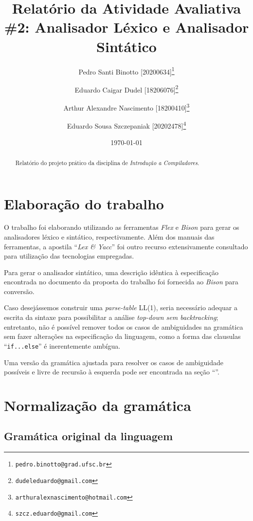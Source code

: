 \documentclass[12pt]{article}
\title{Relatório da Atividade Avaliativa \#2: Analisador Léxico e Analisador Sintático}
\author[1]{Pedro Santi Binotto [20200634]\thanks{\texttt{pedro.binotto@grad.ufsc.br}}}
\author[2]{Eduardo Caigar Dudel [18206076]\thanks{\texttt{dudeleduardo@gmail.com}}}
\author[3]{Arthur Alexandre Nascimento [18200410]\thanks{\texttt{arthuralexnascimento@hotmail.com}}}
\author[4]{Eduardo Sousa Szczepaniak [20202478]\thanks{\texttt{szcz.eduardo@gmail.com}}}
\date{\today}
\affil[1]{Departamento de Informática e Estatística, Universidade Federal de Santa Catarina}
\begin{document}
\begin{titlepage}
\maketitle
\thispagestyle{empty}

\begin{abstract}
  Relatório do projeto prático da disciplina de \textit{Introdução a Compiladores}.
\end{abstract}

\end{titlepage}

\newpage
\tableofcontents

\newpage
\section{Elaboração do trabalho}
\paragraph{}
O trabalho foi elaborando utilizando as ferramentas \textit{Flex}\cite{mitFlex1990} e \textit{Bison}\cite{mitBison1992}
para gerar os analisadores léxico e sintático, respectivamente. Além dos manuais das ferramentas, a apostila
``\textit{Lex \& Yacc}''\cite{niemannYacc} foi outro recurso extensivamente consultado para utilização das tecnologias
empregadas.

Para gerar o analisador sintático, uma descrição idêntica à especificação encontrada no documento da proposta do
trabalho foi fornecida ao \textit{Bison} para conversão. 

Caso desejássemos construir uma \textit{parse-table} LL(1), seria necessário adequar a escrita da sintaxe para
possibilitar a análise \textit{top-down sem backtracking}; entretanto, não é possível remover todos os casos de
ambiguidades na gramática sem fazer alterações na especificação da linguagem, como a forma das clausulas
``\texttt{if...else}'' é inerentemente ambígua. 

Uma versão da gramática ajustada para resolver os casos de ambiguidade possíveis e livre de recursão à esquerda pode ser
encontrada na seção ``''.

\newpage
\section{Normalização da gramática}
\label{sec:normalizacao-gramatica}
\subsection{Gramática original da linguagem}
\end{document}
